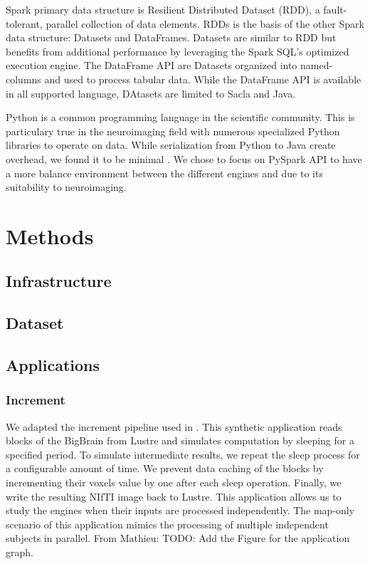 \documentclass[conference]{IEEEtran}
\newcommand{\MD}[1]{\color{magenta}From Mathieu: #1 \color{black}}
\begin{document}
Spark primary data structure is Resilient Distributed Dataset (RDD)\cite{RDD}, a fault-tolerant, parallel collection of data elements.
RDDs is the basis of the other Spark data structure: Datasets and DataFrames.
Datasets are similar to RDD but benefits from additional performance by leveraging the Spark SQL's optimized execution engine.
The DataFrame API are Datasets organized into named-columns and used to process tabular data.
While the DataFrame API is available in all supported language, DAtasets are limited to Sacla and Java.

Python is a common programming language in the scientific community.
This is particulary true in the neuroimaging field with numerous specialized Python libraries to operate on data.
While serialization from Python to Java create overhead, we found it to be minimal \cite{8943502}.
We chose to focus on PySpark API to have a more balance environment between the different engines and due to its suitability to neuroimaging.

\section{Methods}
\subsection{Infrastructure} %
\subsection{Dataset} %

\subsection{Applications}
\subsubsection{Increment}
We adapted the increment pipeline used in \cite{hayot2019performance}.
This synthetic application reads blocks of the BigBrain from Lustre and simulates computation by sleeping for a specified period.
To simulate intermediate results, we repeat the sleep process for a configurable amount of time.
We prevent data caching of the blocks by incrementing their voxels value by one after each sleep operation.
Finally, we write the resulting NIfTI image back to Lustre.
This application allows us to study the engines when their inputs are processed independently.
The map-only scenario of this application mimics the processing of multiple independent subjects in parallel.
\MD{TODO: Add the Figure for the application graph.}
\end{document}
